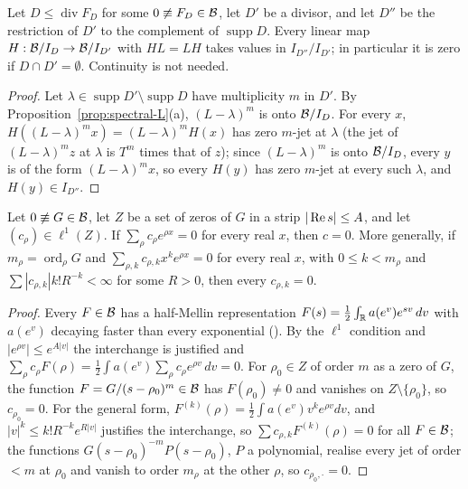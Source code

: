 \begin{lemma}\label{lem:disjoint}
Let $D\le\operatorname{div}F_D$ for some $0\not\equiv F_D\in\mathcal{B}$, let $D'$ be a divisor, and let $D''$ be the restriction of $D'$ to the complement of $\operatorname{supp}D$.
Every linear map $H:\mathcal{B}/I_D\to\mathcal{B}/I_{D'}$ with $HL=LH$ takes values in $I_{D''}/I_{D'}$; in particular it is zero if $D\cap D'=\emptyset$. Continuity is not needed.
\end{lemma}

\begin{proof}
Let $\lambda\in\operatorname{supp}D'\setminus\operatorname{supp}D$ have multiplicity $m$ in $D'$. By Proposition~\ref{prop:spectral-L}(a), $(L-\lambda)^m$ is onto $\mathcal{B}/I_D$. For every $x$, $H((L-\lambda)^mx)=(L-\lambda)^mH(x)$ has zero $m$-jet at $\lambda$ (the jet of $(L-\lambda)^mz$ at $\lambda$ is $T^m$ times that of $z$); since $(L-\lambda)^m$ is onto $\mathcal{B}/I_D$, every $y$ is of the form $(L-\lambda)^mx$, so every $H(y)$ has zero $m$-jet at every such $\lambda$, and $H(y)\in I_{D''}$.
\end{proof}

\begin{lemma}\label{lem:expsum}
Let $0\not\equiv G\in\mathcal{B}$, let $Z$ be a set of zeros of $G$ in a strip $|\operatorname{Re} s|\le A$, and let $(c_\rho)\in\ell^1(Z)$.
If $\sum_\rho c_\rho e^{\rho x}=0$ for every real $x$, then $c=0$. More generally, if $m_\rho=\operatorname{ord}_\rho G$ and $\sum_{\rho,k}c_{\rho,k}x^ke^{\rho x}=0$ for every real $x$, with $0\le k<m_\rho$ and $\sum|c_{\rho,k}|k!R^{-k}<\infty$ for some $R>0$, then every $c_{\rho,k}=0$.
\end{lemma}

\begin{proof}
Every $F\in\mathcal{B}$ has a half-Mellin representation $F(s)=\tfrac12\int_{\mathbb{R}} a(e^v)e^{sv}\,dv$ with $a(e^v)$ decaying faster than every exponential (). By the $\ell^1$ condition and $|e^{\rho v}|\le e^{A|v|}$ the interchange is justified and $\sum_\rho c_\rho F(\rho)=\tfrac12\int a(e^v)\sum_\rho c_\rho e^{\rho v}\,dv=0$.
For $\rho_0\in Z$ of order $m$ as a zero of $G$, the function $F=G/(s-\rho_0)^m\in\mathcal{B}$ has $F(\rho_0)\ne0$ and vanishes on $Z\setminus\{\rho_0\}$, so $c_{\rho_0}=0$.
For the general form, $F^{(k)}(\rho)=\tfrac12\int a(e^v)v^ke^{\rho v}dv$, and $|v|^k\le k!R^{-k}e^{R|v|}$ justifies the interchange, so $\sum c_{\rho,k}F^{(k)}(\rho)=0$ for all $F\in\mathcal{B}$; the functions $G(s-\rho_0)^{-m}P(s-\rho_0)$, $P$ a polynomial, realise every jet of order $<m$ at $\rho_0$ and vanish to order $m_\rho$ at the other $\rho$, so $c_{\rho_0,\cdot}=0$.
\end{proof}


